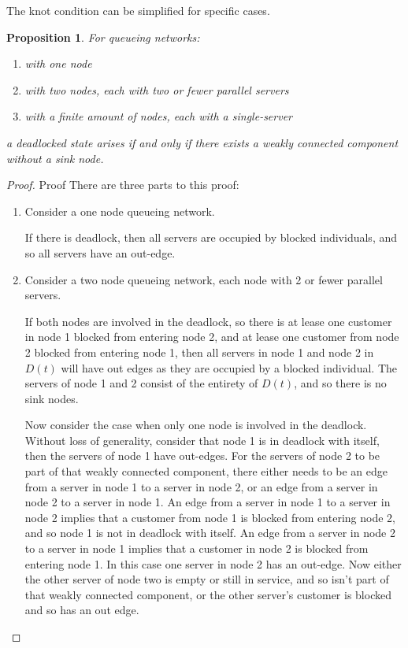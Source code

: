 \documentclass{article}
\newtheorem{proposition}{Proposition}
\numberwithin{equation}{section}
\begin{document}
The knot condition can be simplified for specific cases.

\begin{proposition}
For queueing networks:
\begin{enumerate}
  \item with one node
  \item with two nodes, each with two or fewer parallel servers
  \item with a finite amount of nodes, each with a single-server
\end{enumerate}
a deadlocked state arises if and only if there exists a weakly connected component without a sink node.
\end{proposition}

\begin{proof}{Proof}
  There are three parts to this proof:

  \begin{enumerate}

  \item
  Consider a one node queueing network.

  If there is deadlock, then all servers are occupied by blocked individuals, and so all servers have an out-edge.

  \item
  Consider a two node queueing network, each node with 2 or fewer parallel servers.

  If both nodes are involved in the deadlock, so there is at lease one customer in node 1 blocked from entering node 2, and at lease one customer from node 2 blocked from entering node 1, then all servers in node 1 and node 2 in $D(t)$ will have out edges as they are occupied by a blocked individual.
  The servers of node 1 and 2 consist of the entirety of $D(t)$, and so there is no sink nodes.

  Now consider the case when only one node is involved in the deadlock.
  Without loss of generality, consider that node 1 is in deadlock with itself, then the servers of node 1 have out-edges.
  For the servers of node 2 to be part of that weakly connected component, there either needs to be an edge from a server in node 1 to a server in node 2, or an edge from a server in node 2 to a server in node 1.
  An edge from a server in node 1 to a server in node 2 implies that a customer from node 1 is blocked from entering node 2, and so node 1 is not in deadlock with itself.
  An edge from a server in node 2 to a server in node 1 implies that a customer in node 2 is blocked from entering node 1.
  In this case one server in node 2 has an out-edge.
  Now either the other server of node two is empty or still in service, and so isn't part of that weakly connected component, or the other server's customer is blocked and so has an out edge.


\end{enumerate}
\end{proof}
\end{document}
